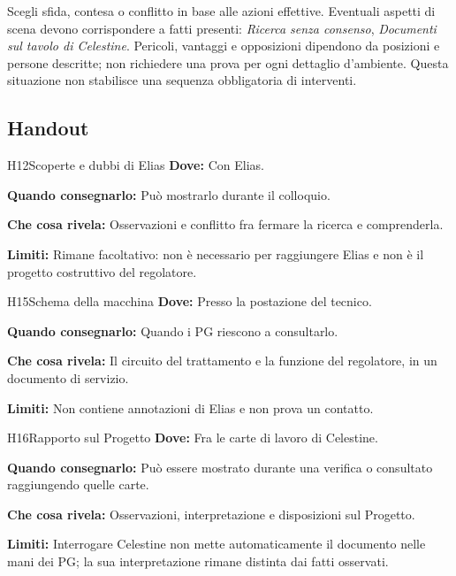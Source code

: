 \documentclass[11pt,a4paper]{article}
\newcommand{\aspect}[1]{\textit{\textcolor{blood}{#1}}}
\begin{document}
\begin{fatebox}
Scegli sfida, contesa o conflitto in base alle azioni effettive. Eventuali aspetti di scena devono corrispondere a fatti presenti: \aspect{Ricerca senza consenso}, \aspect{Documenti sul tavolo di Celestine}. Pericoli, vantaggi e opposizioni dipendono da posizioni e persone descritte; non richiedere una prova per ogni dettaglio d'ambiente. Questa situazione non stabilisce una sequenza obbligatoria di interventi.
\end{fatebox}

\subsection{Handout}
\label{nodo-8-handout}
{}
\begin{handoutbox}{H12}{Scoperte e dubbi di Elias}
\textbf{Dove:} Con Elias.

\textbf{Quando consegnarlo:} Può mostrarlo durante il colloquio.

\textbf{Che cosa rivela:} Osservazioni e conflitto fra fermare la ricerca e comprenderla.

\textbf{Limiti:} Rimane facoltativo: non è necessario per raggiungere Elias e non è il progetto costruttivo del regolatore.
\end{handoutbox}

{}
\begin{handoutbox}{H15}{Schema della macchina}
\textbf{Dove:} Presso la postazione del tecnico.

\textbf{Quando consegnarlo:} Quando i PG riescono a consultarlo.

\textbf{Che cosa rivela:} Il circuito del trattamento e la funzione del regolatore, in un documento di servizio.

\textbf{Limiti:} Non contiene annotazioni di Elias e non prova un contatto.
\end{handoutbox}

{}
\begin{handoutbox}{H16}{Rapporto sul Progetto}
\textbf{Dove:} Fra le carte di lavoro di Celestine.

\textbf{Quando consegnarlo:} Può essere mostrato durante una verifica o consultato raggiungendo quelle carte.

\textbf{Che cosa rivela:} Osservazioni, interpretazione e disposizioni sul Progetto.

\textbf{Limiti:} Interrogare Celestine non mette automaticamente il documento nelle mani dei PG; la sua interpretazione rimane distinta dai fatti osservati.
\end{handoutbox}
\end{document}
